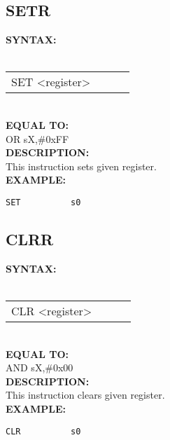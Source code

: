 {                \subsection{SETR}
                \textbf{SYNTAX:}\\
                \\ {
                    \texttt{}
                    \begin{tabular}[h!]{llll}
                            { \color{highlight_instruction} SET    } { \color{highlight_symbol} <register> }
                            { \color{highlight_comment}  }\\
                    \end{tabular}
                    }\\
                    \textbf{EQUAL TO:}\\
                    { \color{highlight_instruction} OR    } { \color{highlight_symbol}      sX,\#0xFF }
                    \\
                \textbf{DESCRIPTION:}\\
                This instruction sets given register.\\
                \textbf{EXAMPLE:}\\
                        \begin{code}[h!]
                            {\color{highlight_symbol}\verb'SET          s0' }\\
                        \end{code}
                \subsection{CLRR}
                \textbf{SYNTAX:}\\
                \\ {
                    \texttt{}
                    \begin{tabular}[h!]{llll}
                            { \color{highlight_instruction} CLR    } { \color{highlight_symbol} <register> }
                            { \color{highlight_comment}  }\\
                    \end{tabular}
                    }\\
                    \textbf{EQUAL TO:}\\
                    { \color{highlight_instruction} AND    } { \color{highlight_symbol}      sX,\#0x00 }
                    \\
                \textbf{DESCRIPTION:}\\
                This instruction clears given register.\\
                \textbf{EXAMPLE:}\\
                        \begin{code}[h!]
                            {\color{highlight_symbol}\verb'CLR          s0' }\\
                        \end{code}
}
